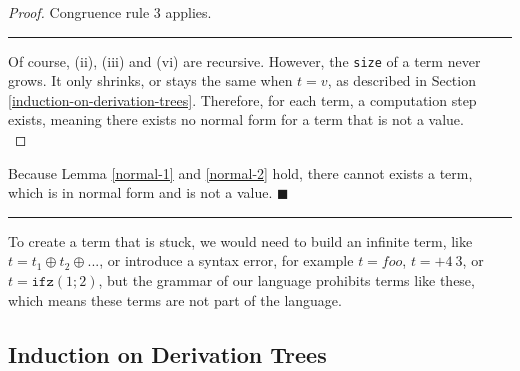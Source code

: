 \documentclass{article}
\begin{document}
\begin{proof}
Congruence rule 3 applies. \\

\hrule
\vspace{1em}

Of course, (ii), (iii) and (vi) are recursive. However, the \texttt{size} of a term never grows. It only shrinks, or stays the same when $t = v$, as described in Section \ref{induction-on-derivation-trees}. Therefore, for each term, a computation step exists, meaning there exists no normal form for a term that is not a value. \\

\end{proof}

Because Lemma \ref{normal-1} and \ref{normal-2} hold, there cannot exists a term, which is in normal form and is not a value. \hfill \(\blacksquare\) \\

\hrule
\vspace{1em}

To create a term that is stuck, we would need to build an infinite term, like $t = t_1 \oplus t_2 \oplus ...$, or introduce a syntax error, for example $t = foo$, $t = + 4\ 3$, or $t = \texttt{ifz}(1; 2)$, but the grammar of our language prohibits terms like these, which means these terms are not part of the language.

%

\newpage 

\subsection*{Induction on Derivation Trees} \label{induction-on-derivation-trees}
\end{document}
